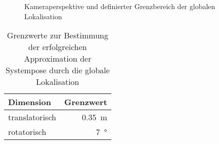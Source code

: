 \begin{figure}[!ht]
	\begin{center}
	\hspace{5mm}
	\caption{Kameraperspektive und definierter Grenzbereich der globalen Lokalisation}
		\label{fig.loclimits}
	\end{center}
\end{figure}

\prever{
}

\begin{table}[ht]
\begin{center}
\setlength{\tabcolsep}{18pt}
	\begin{tabular}[ht]{lr}
	\toprule
	Dimension		& Grenzwert 					\\ 
	\midrule 
	translatorisch  	& \SI{0,35}{\meter}			\\ \addlinespace
	rotatorisch		& \SI{7}{°}					\\ 
	\bottomrule
	\end{tabular} 
	\caption{Grenzwerte zur Bestimmung der erfolgreichen Approximation der Systempose durch die globale Lokalisation}
\label{tab.thresh_glob}
\end{center}
\end{table}

\prever{
}



